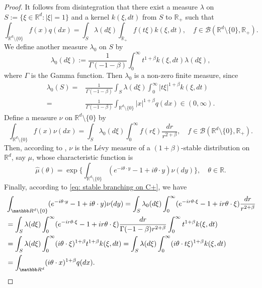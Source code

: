 \documentclass[EJP]{ejpecp} %
\begin{document}
\begin{proof}
	It follows from disintegration that there exist a measure $\lambda$ on $S:= \{\xi\in \mathbb R^d:|\xi| = 1\}$ and a kernel $k(\xi,dt)$ from $S$ to $\mathbb R_+$ such that
\[
    \int_{\mathbb R^d\setminus \{0\}} f(x)q(dx)
    = \int_S \lambda(d\xi) \int_{\mathbb R_+} f(t \xi)k(\xi,dt), 
    \quad f\in \mathcal B(\mathbb R^d\setminus \{0\}, \mathbb R_+).
\]
	We define another measure $\lambda_0$ on $S$ by
\[
    \lambda_0(d\xi)
    := \frac1{\Gamma(-1-\beta)}\int_0^\infty t^{1+\beta}k(\xi,dt) \lambda (d\xi),
\]
	where $\Gamma$ is the Gamma function.
	Then $\lambda_0$ is a non-zero finite measure, since
\begin{align}
    \lambda_0(S)
     = &\frac{1}{\Gamma(-1-\beta)} \int_S \lambda (d\xi) \int_0^\infty |t\xi|^{1+\beta}k(\xi,dt) \\
   	=  & \frac{1}{\Gamma(-1-\beta)} \int_{\mathbb R^d\setminus\{0\}} |x|^{1+\beta} q(dx) \in (0,\infty).
\end{align}
	Define a measure $\nu$ on $\mathbb R^d\setminus\{0\}$ by
\[
    \int_{\mathbb R^d\setminus\{0\}}f(x)\nu(dx)
    = \int_{S} \lambda_0(d\xi) \int_0^\infty f(r\xi) \frac{dr}{r^{2+\beta}},
    \quad f\in \mathcal B(\mathbb R^d\setminus \{0\}, \mathbb R_+).
\]
	Then, according to \cite[Remark 14.4]{Sato2013Levy}, $\nu$ is the L\'evy measure of a $(1+\beta)$-stable distribution on $\mathbb R^d$, say $\mu$, whose characteristic function is
\[
    \hat \mu(\theta)
    = \exp \Big \{ \int_{\mathbb R^d\setminus\{0\}} (e^{-i\theta \cdot y}-1+i\theta \cdot y) \nu(dy) \Big \}, 
    \quad \theta \in \mathbb R.
\]
	Finally, according to \eqref{eq: stable branching on C+}, we have
\begin{align}
   	& \int_{\mathbb R^d\setminus\{0\}} (e^{-i\theta \cdot y}-1+i\theta \cdot y) \nu(dy)
   	= \int_S \lambda_0(d\xi) \int_0^\infty (e^{-ir\theta \cdot \xi}-1+ir\theta \cdot \xi) \frac{dr}{r^{2+\beta}} \\
   	& = \int_S \lambda (d\xi) \int_0^\infty (e^{-ir\theta \cdot \xi}-1+ir\theta \cdot \xi) \frac{dr}{\Gamma(-1-\beta)r^{2+\beta}}\int_0^\infty t^{1+\beta} k(\xi,dt) \\
    & = \int_S \lambda (d\xi) \int_0^\infty (i\theta\cdot \xi)^{1+\beta} t^{1+\beta} k(\xi,dt)
    = \int_S \lambda(d\xi) \int_0^\infty (i\theta \cdot t\xi)^{1+\beta} k(\xi,dt) \\
   	& = \int_{\mathbb R^d} (i\theta \cdot x)^{1+\beta} q(dx).
\qedhere
\end{align}
\end{proof}
\end{document}
